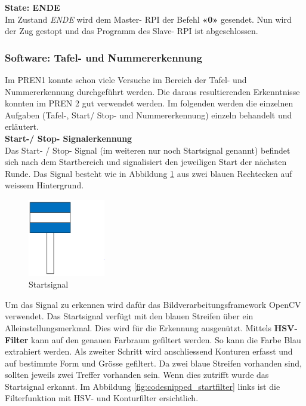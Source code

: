 \documentclass[../../main.tex]{subfiles}
\begin{document}
\textbf{State: ENDE}\\
Im Zustand \textit{ENDE} wird dem Master- RPI der Befehl \textbf{«0»} gesendet. Nun wird der Zug gestopt und das Programm des Slave- RPI ist abgeschlossen.

\newpage

\subsubsection{Software: Tafel- und Nummererkennung}
Im PREN1 konnte schon viele Versuche im Bereich der Tafel- und Nummererkennung durchgeführt werden. Die daraus resultierenden Erkenntnisse konnten im PREN 2 gut verwendet werden. Im folgenden werden die einzelnen Aufgaben (Tafel-, Start/ Stop- und Nummererkennung) einzeln behandelt und erläutert. \\

\textbf{Start-/ Stop- Signalerkennung}\\
Das Start- / Stop- Signal (im weiteren nur noch Startsignal genannt) befindet sich nach dem Startbereich und signalisiert den jeweiligen Start der nächsten Runde. Das Signal besteht wie in Abbildung \ref{fig:startsignal} aus zwei blauen Rechtecken auf weissem Hintergrund. 

\begin{figure} %
  \begin{center}
    \includegraphics[width=0.3\textwidth]{startsignal.png}
  \end{center}
  \caption{Startsignal}
  \label{fig:startsignal}
\end{figure}

Um das Signal zu erkennen wird dafür das Bildverarbeitungsframework OpenCV verwendet. Das Startsignal verfügt mit den blauen Streifen über ein Alleinstellungsmerkmal. Dies wird für die Erkennung ausgenützt. Mittels \textbf{HSV- Filter} kann auf den genauen Farbraum gefiltert werden. So kann die Farbe Blau extrahiert werden. Als zweiter Schritt wird anschliessend Konturen erfasst und auf bestimmte Form und Grösse gefiltert. Da zwei blaue Streifen vorhanden sind, sollten jeweils zwei Treffer vorhanden sein. Wenn dies zutrifft wurde das Startsignal erkannt. Im Abbildung \ref{fig:codesnipped_startfilter} links ist die Filterfunktion mit HSV- und Konturfilter ersichtlich.
\end{document}
